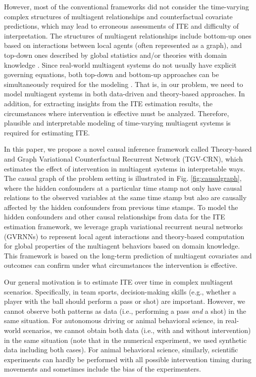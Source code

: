 \documentclass[journal]{IEEEtran}
\newcommand{\modelnospace}{{TGV-CRN}}
\begin{document}
However, most of the conventional frameworks did not consider the time-varying complex structures of multiagent relationships and counterfactual covariate predictions, which may lead to erroneous assessments of ITE and difficulty of interpretation. 
The structures of multiagent relationships include bottom-up ones based on interactions between local agents (often represented as a graph), and top-down ones described by global statistics and/or theories with domain knowledge \cite{Vicsek95,Couzin02}.
Since real-world multiagent systems do not usually have explicit governing equations, both top-down and bottom-up approaches can be simultaneously required for the modeling \cite{Fujii18,Fujii20}.
That is, in our problem, we need to model multiagent systems in both data-driven and theory-based approaches. 
In addition, for extracting insights from the ITE estimation results, the circumstances where intervention is effective must be analyzed.   
Therefore, plausible and interpretable modeling of time-varying multiagent systems is required for estimating ITE.  

In this paper, we propose a novel causal inference framework called Theory-based and Graph Variational Counterfactual Recurrent Network (\modelnospace), which estimates the effect of intervention in multiagent systems in interpretable ways.
The causal graph of the problem setting is illustrated in Fig. \ref{fig:causalgraph}, where the hidden confounders at a particular time stamp not only have causal relations to the observed variables at the same time stamp but also are causally affected by the hidden confounders from previous time stamps.
To model the hidden confounders and other causal relationships from data for the ITE estimation framework, we leverage graph variational recurrent neural networks (GVRNNs) \cite{Yeh19} to represent local agent interactions and theory-based computation for global properties of the multiagent behaviors based on domain knowledge.
This framework is based on the long-term prediction of multiagent covariates and outcomes can confirm under what circumstances the intervention is effective.   

Our general motivation is to estimate ITE over time in complex multiagent scenarios.
Specifically, in team sports, decision-making skills (e.g., whether a player with the ball should perform a pass or shot) are important. However, we cannot observe both patterns as data (i.e., performing a pass \textit{and} a shot) in the same situation. 
For autonomous driving or animal behavioral science, in real-world scenarios, we cannot obtain both data (i.e., with and without intervention) in the same situation (note that in the numerical experiment, we used synthetic data including both cases). For animal behavioral science, similarly, scientific experiments can hardly be performed with all possible intervention timing during movements and sometimes include the bias of the experimenters. 
\end{document}
